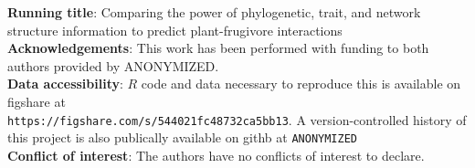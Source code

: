\documentclass[openacc]{rsproca_new}%
\begin{document}
\begin{abstract}
\end{abstract}




%
% 
%




\rsbreak


\noindent \textbf{Running title}: Comparing the power of phylogenetic, trait, and network structure information to predict plant-frugivore interactions \\


\noindent \textbf{Acknowledgements}: This work has been performed with funding to both authors provided by ANONYMIZED. \\


\noindent \textbf{Data accessibility}: $R$ code and data necessary to reproduce this is available on figshare at \\ \texttt{https://figshare.com/s/544021fc48732ca5bb13}. A version-controlled history of this project is also publically available on githb at \texttt{ANONYMIZED} \\

\noindent \textbf{Conflict of interest}: The authors have no conflicts of interest to declare.\\
\end{document}
